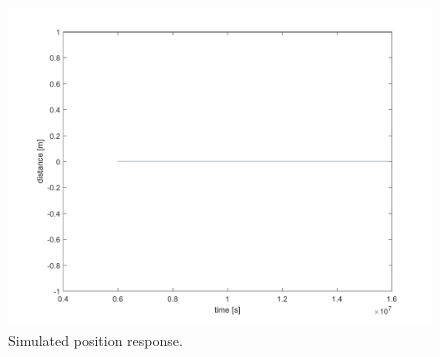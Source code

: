 \documentclass[a4paper,12pt,oneside,onecolumn]{article} %
\begin{document}
    \begin{figure}[H]
        \centering
        \includegraphics[scale = 0.5]{../matlab/images/task11_d0plot.png}
        \caption{Simulated position response.}
        \label{fig:task11_d0plot}
    \end{figure}
\end{document}
